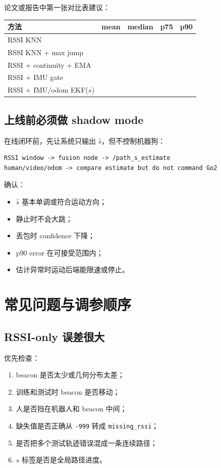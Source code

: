 \documentclass[11pt,a4paper,openany]{report}
\newcommand{\code}[1]{\nolinkurl{#1}}
\newcommand{\param}[1]{\nolinkurl{#1}}
\begin{document}
论文或报告中第一张对比表建议：

\begin{longtable}{p{}p{}p{}p{}p{}}
\toprule
方法 & mean & median & p75 & p90 \\
\midrule
RSSI KNN &  &  &  &  \\
RSSI KNN + max jump &  &  &  &  \\
RSSI + continuity + EMA &  &  &  &  \\
RSSI + IMU gate &  &  &  &  \\
RSSI + IMU/odom EKF(\(s\)) &  &  &  &  \\
\bottomrule
\end{longtable}

\section{上线前必须做 shadow mode}

在线闭环前，先让系统只输出 \(\hat{s}\)，但不控制机器狗：

\begin{lstlisting}
RSSI window -> fusion node -> /path_s_estimate
human/video/odom -> compare estimate but do not command Go2
\end{lstlisting}

确认：

\begin{itemize}
  \item \(\hat{s}\) 基本单调或符合运动方向；
  \item 静止时不会大跳；
  \item 丢包时 confidence 下降；
  \item p90 error 在可接受范围内；
  \item 估计异常时运动后端能限速或停止。
\end{itemize}

\chapter{常见问题与调参顺序}
\label{chap:debug}

\section{RSSI-only 误差很大}

优先检查：

\begin{enumerate}
  \item beacon 是否太少或几何分布太差；
  \item 训练和测试时 beacon 是否移动；
  \item 人是否挡在机器人和 beacon 中间；
  \item 缺失值是否正确从 \code{-999} 转成 \param{missing_rssi}；
  \item 是否把多个测试轨迹错误混成一条连续路径；
  \item \(s\) 标签是否是全局路径进度。
\end{enumerate}
\end{document}

